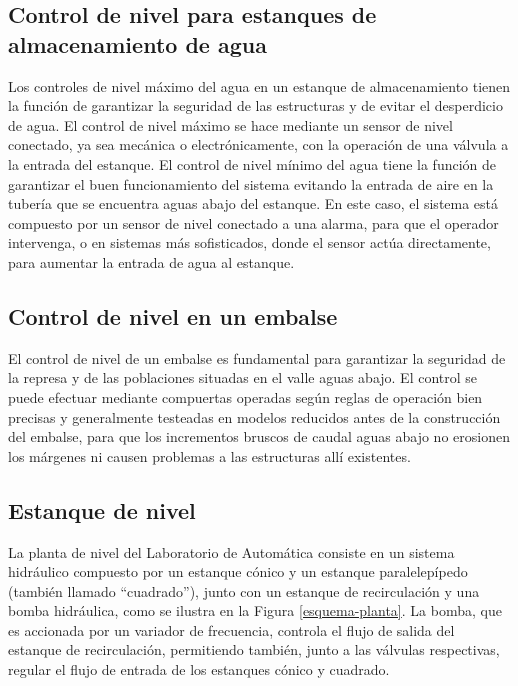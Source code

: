\documentclass[11pt,letterpaper,notitlepage]{article}
\begin{document}
\subsection{Control de nivel para estanques de almacenamiento de agua}

Los controles de nivel máximo del agua en un estanque de almacenamiento tienen la función de garantizar la seguridad de las estructuras y de evitar el desperdicio de agua. El control de nivel máximo se hace mediante un sensor de nivel conectado, ya sea mecánica o electrónicamente, con la operación de una válvula a la entrada del estanque. El control de nivel mínimo del agua tiene la función de garantizar el buen funcionamiento del sistema evitando la entrada de aire en la tubería que se encuentra aguas abajo del estanque. En este caso, el sistema está compuesto por un sensor de nivel conectado a una alarma, para que el operador intervenga, o en sistemas más sofisticados, donde el sensor actúa directamente, para aumentar la entrada de agua al estanque.

\subsection{Control de nivel en un embalse}

El control de nivel de un embalse es fundamental para garantizar la seguridad de la represa y de las poblaciones situadas en el valle aguas abajo. El control se puede efectuar mediante compuertas operadas según reglas de operación bien precisas y generalmente testeadas en modelos reducidos antes de la construcción del embalse, para que los incrementos bruscos de caudal aguas abajo no erosionen los márgenes ni causen problemas a las estructuras allí existentes.

\subsection{Estanque de nivel}

La planta de nivel del Laboratorio de Automática consiste en un sistema hidráulico compuesto por un estanque cónico y un estanque paralelepípedo (también llamado “cuadrado”), junto con un estanque de recirculación y una bomba hidráulica, como se ilustra en la Figura \ref{esquema-planta}. La bomba, que es accionada por un variador de frecuencia, controla el flujo de salida del estanque de recirculación, permitiendo también, junto a las válvulas respectivas, regular el flujo de entrada de los estanques cónico y cuadrado.
\end{document}
